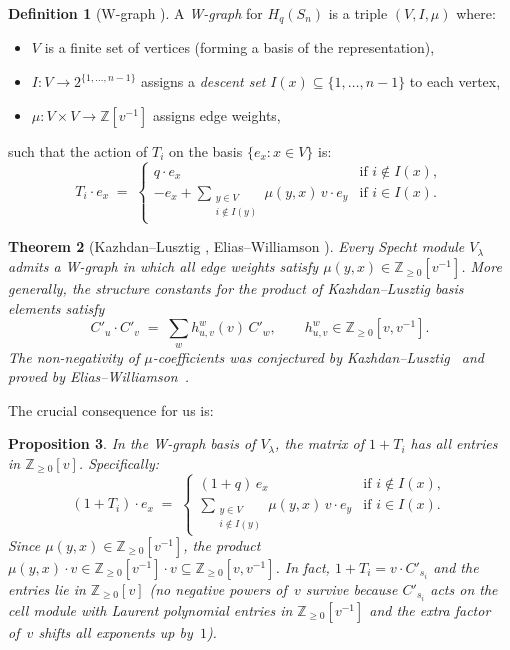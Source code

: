 \documentclass[11pt]{article}
\newtheorem{theorem}{Theorem}
\newtheorem{proposition}[theorem]{Proposition}
\theoremstyle{definition}
\newtheorem{definition}[theorem]{Definition}
\theoremstyle{remark}
\begin{document}
\begin{definition}[W-graph {\cite{KL79}}]
A \emph{W-graph} for $H_q(S_n)$ is a triple $(V, I, \mu)$ where:
\begin{itemize}
\item $V$ is a finite set of vertices (forming a basis of the representation),
\item $I \colon V \to 2^{\{1,\ldots,n-1\}}$ assigns a \emph{descent set}
  $I(x) \subseteq \{1, \ldots, n-1\}$ to each vertex,
\item $\mu \colon V \times V \to \mathbb{Z}[v^{-1}]$ assigns edge weights,
\end{itemize}
such that the action of $T_i$ on the basis $\{e_x : x \in V\}$ is:
\[
  T_i \cdot e_x \;=\;
  \begin{cases}
    q \cdot e_x & \text{if } i \notin I(x), \\[4pt]
    -e_x + \displaystyle\sum_{\substack{y \in V \\ i \notin I(y)}}
      \mu(y, x)\, v \cdot e_y
    & \text{if } i \in I(x).
  \end{cases}
\]
\end{definition}

\begin{theorem}[Kazhdan--Lusztig {\cite{KL79}}, Elias--Williamson {\cite{EW14}}]
\label{thm:KLpos}
Every Specht module $V_\lambda$ admits a W-graph in which
all edge weights satisfy $\mu(y, x) \in \mathbb{Z}_{\geq 0}[v^{-1}]$.
More generally, the structure constants for the product of
Kazhdan--Lusztig basis elements satisfy
\[
  C'_u \cdot C'_v \;=\; \sum_{w} h^w_{u,v}(v)\, C'_w,
  \qquad h^w_{u,v} \in \mathbb{Z}_{\geq 0}[v, v^{-1}].
\]
The non-negativity of $\mu$-coefficients was conjectured by
Kazhdan--Lusztig~\cite{KL79} and proved by
Elias--Williamson~\cite{EW14}.
\end{theorem}

The crucial consequence for us is:

\begin{proposition}\label{prop:1pTpos}
In the W-graph basis of $V_\lambda$, the matrix of $1 + T_i$ has
all entries in $\mathbb{Z}_{\geq 0}[v]$. Specifically:
\[
  (1 + T_i) \cdot e_x \;=\;
  \begin{cases}
    (1 + q)\, e_x & \text{if } i \notin I(x), \\[4pt]
    \displaystyle\sum_{\substack{y \in V \\ i \notin I(y)}}
      \mu(y, x)\, v \cdot e_y
    & \text{if } i \in I(x).
  \end{cases}
\]
Since $\mu(y,x) \in \mathbb{Z}_{\geq 0}[v^{-1}]$, the product
$\mu(y,x) \cdot v \in \mathbb{Z}_{\geq 0}[v^{-1}] \cdot v
\subseteq \mathbb{Z}_{\geq 0}[v, v^{-1}]$.
In fact, $1 + T_i = v \cdot C'_{s_i}$ and the entries lie in
$\mathbb{Z}_{\geq 0}[v]$ (no negative powers of~$v$ survive
because $C'_{s_i}$ acts on the cell module with Laurent polynomial
entries in $\mathbb{Z}_{\geq 0}[v^{-1}]$ and the extra factor of~$v$
shifts all exponents up by~$1$).
\end{proposition}
\end{document}
